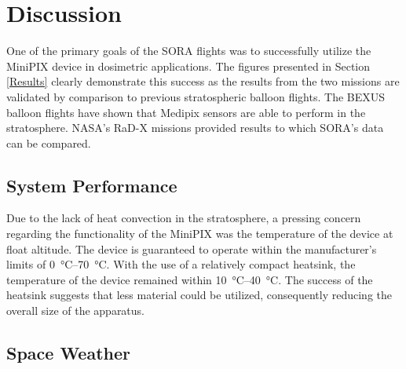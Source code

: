 
\section{Discussion}

\label{Discussion}

One of the primary goals of the SORA flights was to successfully utilize the MiniPIX device in dosimetric applications. The figures presented in Section \ref{Results} clearly demonstrate this success as the results from the two missions are validated by comparison to previous stratospheric balloon flights. The BEXUS \cite{bexus} balloon flights have shown that Medipix sensors are able to perform in the stratosphere. NASA's RaD-X missions \cite{rad-x} provided results to which SORA's data can be compared.

\subsection{System Performance}



Due to the lack of heat convection in the stratosphere, a pressing concern regarding the functionality of the MiniPIX was the temperature of the device at float altitude. The device is guaranteed to operate within the manufacturer's limits of \SIrange{0}{70}{\celsius}. With the use of a relatively compact heatsink, the temperature of the device remained within \SIrange{10}{40}{\celsius}. The success of the heatsink suggests that less material could be utilized, consequently reducing the overall size of the apparatus.

\subsection{Space Weather}


